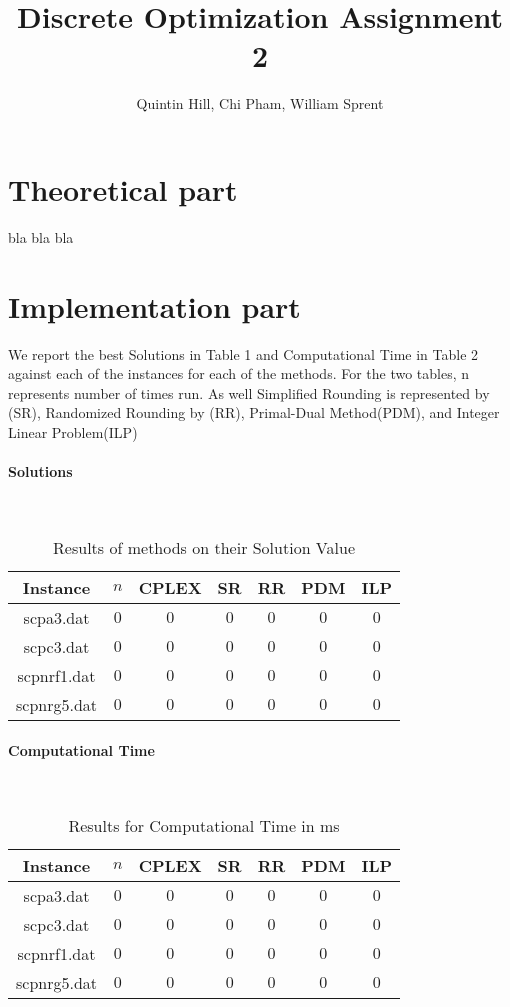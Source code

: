 \documentclass[11pt,a4paper,english]{article}
\begin{document}
\title{Discrete Optimization Assignment 2}
\author{Quintin Hill, Chi Pham, William Sprent}
\maketitle
\tableofcontents
\clearpage

\section{Theoretical part}
bla bla bla
\clearpage

\section{Implementation part}

We report the best Solutions in Table 1 and Computational Time in Table 2 against each of the instances for each of the methods. For the two tables, n represents number of times run. As well Simplified Rounding is represented by (SR), Randomized Rounding by (RR), Primal-Dual Method(PDM), and Integer Linear Problem(ILP)

\paragraph{Solutions}\mbox{}\\


\begin{table}[h!]
  \centering
  \begin{tabular}{|c|c|c|c|c|c|c|}\hline
    Instance& $n$& CPLEX&SR&RR&PDM&ILP  \\\hline
    scpa3.dat &$0$&$0$ & $0$ & $0$& $0$ & $0$  \\
    scpc3.dat &$0$&$0$ & $0$ & $0$& $0$ & $0$ \\
    scpnrf1.dat &$0$&$0$ & $0$ & $0$& $0$ & $0$  \\
    scpnrg5.dat &$0$&$0$ & $0$ & $0$& $0$ & $0$  \\\hline
  \end{tabular}
  \caption{Results of methods on their Solution Value}
  \label{tab:res}
\end{table}

\paragraph{Computational Time}\mbox{}\\

\begin{table}[h!]
  \centering
  \begin{tabular}{|c|c|c|c|c|c|c|}\hline
    Instance& $n$& CPLEX&SR&RR&PDM&ILP \\\hline
    scpa3.dat &$0$&$0$ & $0$ & $0$& $0$ & $0$  \\
    scpc3.dat &$0$&$0$ & $0$ & $0$& $0$ & $0$ \\
    scpnrf1.dat	 &$0$&$0$ & $0$ & $0$& $0$ & $0$  \\
    scpnrg5.dat &$0$&$0$ & $0$ & $0$& $0$ & $0$  \\\hline
  \end{tabular}
  \caption{Results for Computational Time in ms}
  \label{tab:res}
\end{table}
\end{document}
